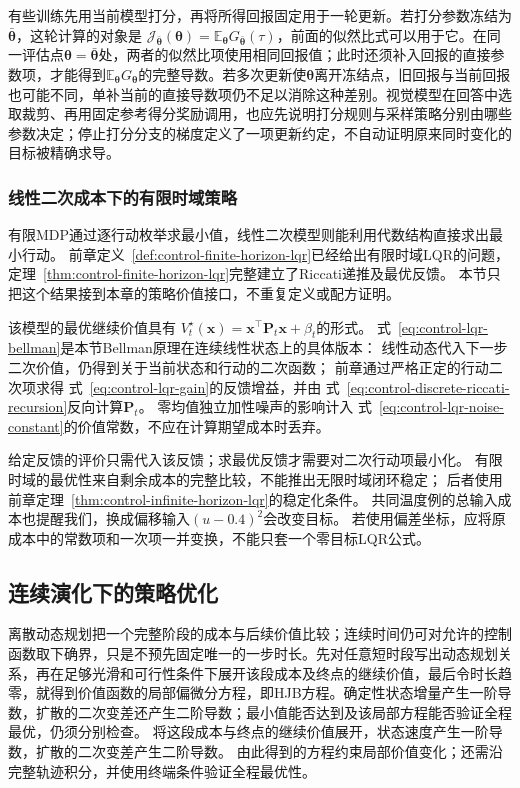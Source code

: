 有些训练先用当前模型打分，再将所得回报固定用于一轮更新。若打分参数冻结为\(\bar{\bm\theta}\)，这轮计算的对象是
\(\mathcal J_{\bar{\bm\theta}}(\bm\theta)=\mathbb E_{\bm\theta}G_{\bar{\bm\theta}}(\tau)\)，前面的似然比式可以用于它。在同一评估点\(\bm\theta=\bar{\bm\theta}\)处，两者的似然比项使用相同回报值；此时还须补入回报的直接参数项，才能得到\(\mathbb E_{\bm\theta}G_{\bm\theta}\)的完整导数。若多次更新使\(\bm\theta\)离开冻结点，旧回报与当前回报也可能不同，单补当前的直接导数项仍不足以消除这种差别。视觉模型在回答中选取裁剪、再用固定参考得分奖励调用，也应先说明打分规则与采样策略分别由哪些参数决定；停止打分分支的梯度定义了一项更新约定，不自动证明原来同时变化的目标被精确求导。

\subsubsection{线性二次成本下的有限时域策略}

有限MDP通过逐行动枚举求最小值，线性二次模型则能利用代数结构直接求出最小行动。
前章定义~\ref{def:control-finite-horizon-lqr}已经给出有限时域LQR的问题，
定理~\ref{thm:control-finite-horizon-lqr}完整建立了Riccati递推及最优反馈。
本节只把这个结果接到本章的策略价值接口，不重复定义或配方证明。

该模型的最优继续价值具有
$V_t^\star(\bm x)=\bm x^\top\bm P_t\bm x+\beta_t$的形式。
式~\eqref{eq:control-lqr-bellman}是本节Bellman原理在连续线性状态上的具体版本：
线性动态代入下一步二次价值，仍得到关于当前状态和行动的二次函数；
前章通过严格正定的行动二次项求得
式~\eqref{eq:control-lqr-gain}的反馈增益，并由
式~\eqref{eq:control-discrete-riccati-recursion}反向计算$\bm P_t$。
零均值独立加性噪声的影响计入
式~\eqref{eq:control-lqr-noise-constant}的价值常数，不应在计算期望成本时丢弃。

给定反馈的评价只需代入该反馈；求最优反馈才需要对二次行动项最小化。
有限时域的最优性来自剩余成本的完整比较，不能推出无限时域闭环稳定；
后者使用前章定理~\ref{thm:control-infinite-horizon-lqr}的稳定化条件。
共同温度例的总输入成本也提醒我们，换成偏移输入$(u-0.4)^2$会改变目标。
若使用偏差坐标，应将原成本中的常数项和一次项一并变换，不能只套一个零目标LQR公式。

\subsection{连续演化下的策略优化}
\label{sec:control-hjb}

离散动态规划把一个完整阶段的成本与后续价值比较；连续时间仍可对允许的控制函数取下确界，只是不预先固定唯一的一步时长。先对任意短时段写出动态规划关系，再在足够光滑和可行性条件下展开该段成本及终点的继续价值，最后令时长趋零，就得到价值函数的局部偏微分方程，即HJB方程。确定性状态增量产生一阶导数，扩散的二次变差还产生二阶导数；最小值能否达到及该局部方程能否验证全程最优，仍须分别检查。
将这段成本与终点的继续价值展开，状态速度产生一阶导数，扩散的二次变差产生二阶导数。
由此得到的方程约束局部价值变化；还需沿完整轨迹积分，并使用终端条件验证全程最优性。

